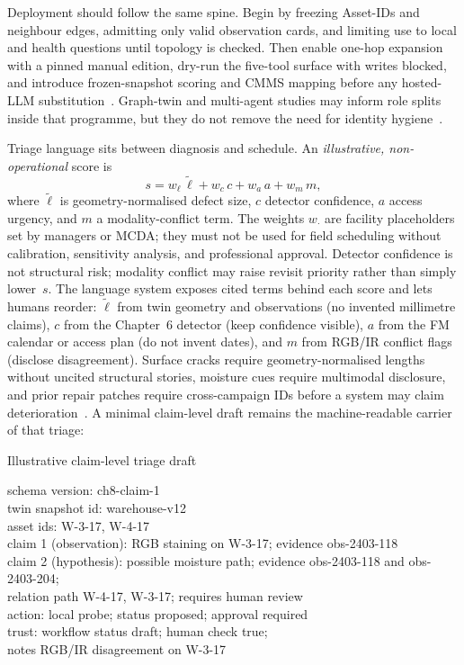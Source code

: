 Deployment should follow the same spine. Begin by freezing Asset-IDs and neighbour edges, admitting only valid observation cards, and limiting use to local and health questions until topology is checked. Then enable one-hop expansion with a pinned manual edition, dry-run the five-tool surface with writes blocked, and introduce frozen-snapshot scoring and CMMS mapping before any hosted-LLM substitution~\cite{zhang2025,zhao2026physical,peng2024,lee2024ragsafety,gao2026ifcagent,liang2023helm,ma2026tenquestions,buga2025llmfmsql}. Graph-twin and multi-agent studies may inform role splits inside that programme, but they do not remove the need for identity hygiene~\cite{pan2026graphdtgpt,rawat2025llmmas,lu2026highwaymas}.

Triage language sits between diagnosis and schedule. An \emph{illustrative, non-operational} score is
\begin{equation}
\label{eq:ch8-score}
s = w_{\ell}\,\tilde{\ell} + w_{c}\,c + w_{a}\,a + w_{m}\,m,
\end{equation}
where $\tilde{\ell}$ is geometry-normalised defect size, $c$ detector confidence, $a$ access urgency, and $m$ a modality-conflict term. The weights $w_{\cdot}$ are facility placeholders set by managers or MCDA; they must not be used for field scheduling without calibration, sensitivity analysis, and professional approval. Detector confidence is not structural risk; modality conflict may raise revisit priority rather than simply lower~$s$. The language system exposes cited terms behind each score and lets humans reorder: $\tilde{\ell}$ from twin geometry and observations (no invented millimetre claims), $c$ from the Chapter~6 detector (keep confidence visible), $a$ from the FM calendar or access plan (do not invent dates), and $m$ from RGB/IR conflict flags (disclose disagreement). Surface cracks require geometry-normalised lengths without uncited structural stories, moisture cues require multimodal disclosure, and prior repair patches require cross-campaign IDs before a system may claim deterioration~\cite{zhao2024facade,zhao2026physical,jeon2025hybridrag}. A minimal claim-level draft remains the machine-readable carrier of that triage:

\begin{programcode}{Illustrative claim-level triage draft}
\begin{plainlisting}
schema version: ch8-claim-1\\
twin snapshot id: warehouse-v12\\
asset ids: W-3-17, W-4-17\\
claim 1 (observation): RGB staining on W-3-17; evidence obs-2403-118\\
claim 2 (hypothesis): possible moisture path; evidence obs-2403-118 and obs-2403-204;\\
relation path W-4-17, W-3-17; requires human review\\
action: local probe; status proposed; approval required\\
trust: workflow status draft; human check true;\\
notes RGB/IR disagreement on W-3-17
\end{plainlisting}
\end{programcode}

